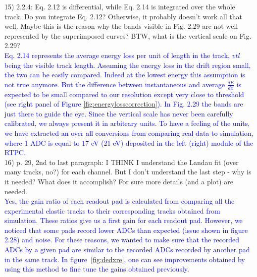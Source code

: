 15) 2.2.4: Eq. 2.12 is differential, while Eq. 2.14 is integrated over the 
whole track. Do you integrate Eq. 2.12? Otherwise, it probably doesn't work all 
that well. Maybe this is the reason why the bands visible in Fig. 2.29 are not 
well represented by the superimposed curves? BTW, what is the vertical scale on 
Fig. 2.29?\\
\textcolor{blue}{Eq. 2.14 represents the average energy loss per unit of length in the 
track, $vtl$ being the visible track length. Assuming the energy loss in the 
drift region small, the two can be easily compared. Indeed at the lowest energy 
this assumption is not true anymore. But the difference between instantaneous 
and average $\frac{dE}{dx}$ is expected to be small compared to our 
resolution except very close to threshold (see right panel of Figure 
\ref{fig:energylosscorrection}).}
\textcolor{blue}{In Fig. 2.29 the bands are just there to guide the eye. Since the
vertical scale has never been carefully calibrated, we always present it in
arbitrary units. To have a feeling of the units, we have extracted an over all 
conversions from comparing real data to simulation, where 1 ADC is equal to 17 eV 
(21 eV) deposited in the left (right) module of the RTPC.} \\


16) p. 29, 2nd to last paragraph: I THINK I understand the Landau fit (over 
many tracks, no?) for each channel. But I don't understand the last step - why 
is it needed? What does it accomplish? For sure more details (and a plot) are 
needed.\\
\textcolor{blue}{
Yes, the gain ratio of each readout pad is calculated from comparing all the 
experimental elastic tracks to their corresponding tracks obtained from 
simulation. These ratios give us a first gain for each readout pad. However, 
we noticed that some pads record lower ADCs than expected (issue shown in 
figure 2.28) and noise. For these reasons, we wanted to make sure that the recorded 
ADCs by a given pad are similar to the recorded ADCs recorded by another pad in 
the same track. In figure~\ref{fig:dedxre}, one can see improvements obtained
by using this method to fine tune the gains obtained previously.} \\

